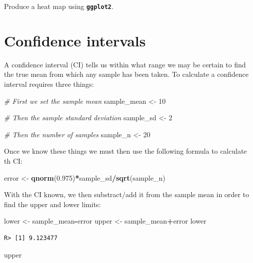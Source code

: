 \documentclass[english,10pt,a4paper,oneside]{book}
\newenvironment{Shaded}{\begin{snugshade}}{\end{snugshade}}
\newcommand{\KeywordTok}[1]{\textcolor[rgb]{0.13,0.29,0.53}{\textbf{#1}}}
\newcommand{\DecValTok}[1]{\textcolor[rgb]{0.00,0.00,0.81}{#1}}
\newcommand{\FloatTok}[1]{\textcolor[rgb]{0.00,0.00,0.81}{#1}}
\newcommand{\StringTok}[1]{\textcolor[rgb]{0.31,0.60,0.02}{#1}}
\newcommand{\CommentTok}[1]{\textcolor[rgb]{0.56,0.35,0.01}{\textit{#1}}}
\newcommand{\OperatorTok}[1]{\textcolor[rgb]{0.81,0.36,0.00}{\textbf{#1}}}
\newcommand{\NormalTok}[1]{#1}
\theoremstyle{definition}
\theoremstyle{definition}
\theoremstyle{definition}
\theoremstyle{remark}
\begin{document}
Produce a heat map using \textbf{\texttt{ggplot2}}.

\chapter{Confidence intervals}\label{confidence-intervals}

A confidence interval (CI) tells us within what range we may be certain
to find the true mean from which any sample has been taken. To calculate
a confidence interval requires three things:

\begin{Shaded}
\begin{Highlighting}[]
\CommentTok{# First we set the sample mean}
\NormalTok{sample_mean <-}\StringTok{ }\DecValTok{10}

\CommentTok{# Then the sample standard deviation}
\NormalTok{sample_sd <-}\StringTok{ }\DecValTok{2}

\CommentTok{# Then the number of samples}
\NormalTok{sample_n <-}\StringTok{ }\DecValTok{20}
\end{Highlighting}
\end{Shaded}

Once we know these things we must then use the following formula to
calculate th CI:

\begin{Shaded}
\begin{Highlighting}[]
\NormalTok{error <-}\StringTok{ }\KeywordTok{qnorm}\NormalTok{(}\FloatTok{0.975}\NormalTok{)}\OperatorTok{*}\NormalTok{sample_sd}\OperatorTok{/}\KeywordTok{sqrt}\NormalTok{(sample_n)}
\end{Highlighting}
\end{Shaded}

With the CI known, we then substract/add it from the sample mean in
order to find the upper and lower limits:

\begin{Shaded}
\begin{Highlighting}[]
\NormalTok{lower <-}\StringTok{ }\NormalTok{sample_mean}\OperatorTok{-}\NormalTok{error}
\NormalTok{upper <-}\StringTok{ }\NormalTok{sample_mean}\OperatorTok{+}\NormalTok{error}
\NormalTok{lower}
\end{Highlighting}
\end{Shaded}

\begin{verbatim}
R> [1] 9.123477
\end{verbatim}

\begin{Shaded}
\begin{Highlighting}[]
\NormalTok{upper}
\end{Highlighting}
\end{Shaded}
\end{document}
